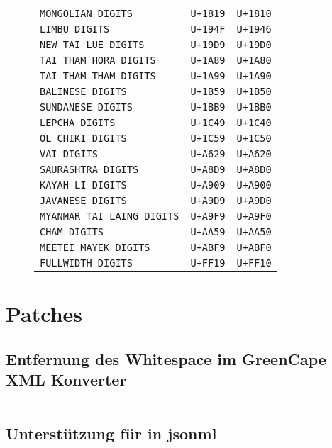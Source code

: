 \begin{figure}[hb!]
\begin{center}
\begin{tabular}{lrr}
\texttt{MONGOLIAN DIGITS} & \texttt{U+1819} &  \texttt{U+1810}\\
\texttt{LIMBU DIGITS} & \texttt{U+194F} &  \texttt{U+1946}\\
\texttt{NEW TAI LUE DIGITS} & \texttt{U+19D9} &  \texttt{U+19D0}\\
\texttt{TAI THAM HORA DIGITS} & \texttt{U+1A89} &  \texttt{U+1A80}\\
\texttt{TAI THAM THAM DIGITS} & \texttt{U+1A99} &  \texttt{U+1A90}\\
\texttt{BALINESE DIGITS} & \texttt{U+1B59} &  \texttt{U+1B50}\\
\texttt{SUNDANESE DIGITS} & \texttt{U+1BB9} &  \texttt{U+1BB0}\\
\texttt{LEPCHA DIGITS} & \texttt{U+1C49} &  \texttt{U+1C40}\\
\texttt{OL CHIKI DIGITS} & \texttt{U+1C59} &  \texttt{U+1C50}\\
\texttt{VAI DIGITS} & \texttt{U+A629} &  \texttt{U+A620}\\
\texttt{SAURASHTRA DIGITS} & \texttt{U+A8D9} &  \texttt{U+A8D0}\\
\texttt{KAYAH LI DIGITS} & \texttt{U+A909} &  \texttt{U+A900}\\
\texttt{JAVANESE DIGITS} & \texttt{U+A9D9} &  \texttt{U+A9D0}\\
\texttt{MYANMAR TAI LAING DIGITS} & \texttt{U+A9F9} &  \texttt{U+A9F0}\\
\texttt{CHAM DIGITS} & \texttt{U+AA59} &  \texttt{U+AA50}\\
\texttt{MEETEI MAYEK DIGITS} & \texttt{U+ABF9} &  \texttt{U+ABF0}\\
\texttt{FULLWIDTH DIGITS} & \texttt{U+FF19} &  \texttt{U+FF10}\\
            \bottomrule
        \end{tabular}
        \endgroup
    \end{center}
\end{figure}

\chapter{Patches}
\label{appx:patches}

\section{Entfernung des Whitespace im GreenCape XML Konverter}
\label{appx:greencapexml}

\inputminted[breakautoindent=false,fontsize=\footnotesize]{udiff}{patches/greencapexml-noindent.patch}

\newpage{}
\section{Unterstützung für  in \acrshort{jsonml}}
\label{appx:jsonmlpi}

\inputminted[breakautoindent=false,fontsize=\footnotesize]{udiff}{patches/jsonml-pi.patch}
